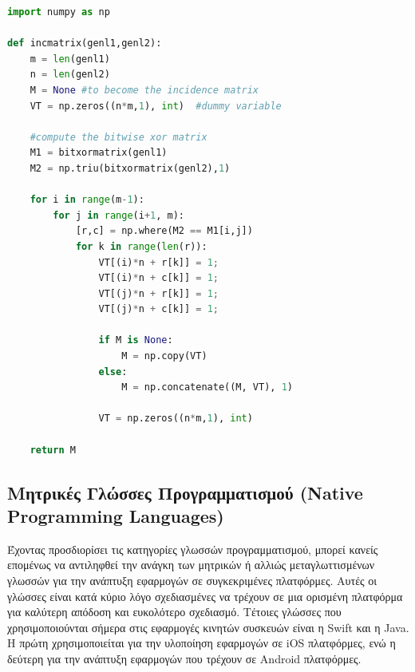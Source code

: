 \begin{lstlisting}[language=Python, caption=\selectlanguage{greek}Παράδειγμα κώδικα σε \selectlanguage{english}Python]
import numpy as np
 
def incmatrix(genl1,genl2):
    m = len(genl1)
    n = len(genl2)
    M = None #to become the incidence matrix
    VT = np.zeros((n*m,1), int)  #dummy variable
 
    #compute the bitwise xor matrix
    M1 = bitxormatrix(genl1)
    M2 = np.triu(bitxormatrix(genl2),1) 
 
    for i in range(m-1):
        for j in range(i+1, m):
            [r,c] = np.where(M2 == M1[i,j])
            for k in range(len(r)):
                VT[(i)*n + r[k]] = 1;
                VT[(i)*n + c[k]] = 1;
                VT[(j)*n + r[k]] = 1;
                VT[(j)*n + c[k]] = 1;
 
                if M is None:
                    M = np.copy(VT)
                else:
                    M = np.concatenate((M, VT), 1)
 
                VT = np.zeros((n*m,1), int)
 
    return M
\end{lstlisting}

\subsection{Μητρικές Γλώσσες Προγραμματισμού (Native Programming Languages)}
Έχοντας προσδιορίσει τις κατηγορίες γλωσσών προγραμματισμού, μπορεί κανείς επομένως να αντιληφθεί την ανάγκη των μητρικών ή αλλιώς μεταγλωττισμένων γλωσσών για την ανάπτυξη εφαρμογών σε συγκεκριμένες πλατφόρμες. Αυτές οι γλώσσες είναι κατά κύριο λόγο σχεδιασμένες να τρέχουν σε μια ορισμένη πλατφόρμα για καλύτερη απόδοση και ευκολότερο σχεδιασμό. Τέτοιες γλώσσες που χρησιμοποιούνται σήμερα στις εφαρμογές κινητών συσκευών είναι η Swift και η Java. Η πρώτη χρησιμοποιείται για την υλοποίηση εφαρμογών σε iOS πλατφόρμες, ενώ η δεύτερη για την ανάπτυξη εφαρμογών που τρέχουν σε Android πλατφόρμες.

